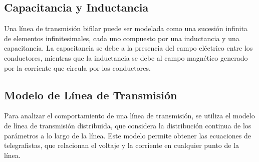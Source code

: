 \subsection{Capacitancia y Inductancia}

Una línea de transmisión bifilar puede ser modelada como una sucesión infinita de elementos infinitesimales, cada uno compuesto por una inductancia y una capacitancia. La capacitancia se debe a la presencia del campo eléctrico entre los conductores, mientras que la inductancia se debe al campo magnético generado por la corriente que circula por los conductores.

\subsection{Modelo de Línea de Transmisión}

Para analizar el comportamiento de una línea de transmisión, se utiliza el modelo de línea de transmisión distribuida, que considera la distribución continua de los parámetros a lo largo de la línea. Este modelo permite obtener las ecuaciones de telegrafistas, que relacionan el voltaje y la corriente en cualquier punto de la línea.


\begin{comment}Para la línea de transmisión bifilar que muestra la figura \ref{fig:linea-bifilar} con conductores de radio a y
conductividad σc con una separación entre centros igual a d y un medio de permeabilidad μ,

que la capacitancia está dada por \end{comment}

